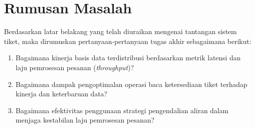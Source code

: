 \section{Rumusan Masalah}
\label{sec:rumusan-masalah}

Berdasarkan latar belakang yang telah diuraikan mengenai tantangan sistem tiket, maka dirumuskan pertanyaan-pertanyaan tugas akhir sebagaimana berikut:

\begin{enumerate}
    \item Bagaimana kinerja basis data terdistribusi berdasarkan metrik latensi dan laju pemrosesan pesanan (\textit{throughput})?
    \item Bagaimana dampak pengoptimalan operasi baca ketersediaan tiket terhadap kinerja dan keterbaruan data?
    \item Bagaimana efektivitas penggunaan strategi pengendalian aliran dalam menjaga kestabilan laju pemrosesan pesanan?
\end{enumerate}
